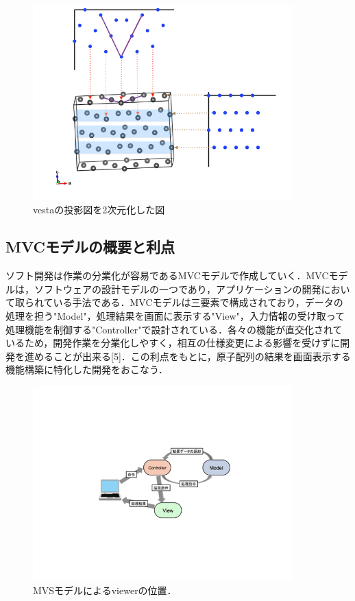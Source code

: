 \begin{figure}[htbp]\begin{center}
\includegraphics[width=10cm,bb= 0 0 737 553]{../figs/./boundary_narita.007.jpeg}
\caption{vestaの投影図を2次元化した図}
\label{default}\end{center}\end{figure}
\subsection{MVCモデルの概要と利点}
ソフト開発は作業の分業化が容易であるMVCモデルで作成していく．MVCモデルは，ソフトウェアの設計モデルの一つであり，アプリケーションの開発において取られている手法である．MVCモデルは三要素で構成されており，データの処理を担う"Model"，処理結果を画面に表示する"View"，入力情報の受け取って処理機能を制御する"Controller"で設計されている．各々の機能が直交化されているため，開発作業を分業化しやすく，相互の仕様変更による影響を受けずに開発を進めることが出来る[5]．この利点をもとに，原子配列の結果を画面表示する機能構築に特化した開発をおこなう．

\begin{figure}[htbp]\begin{center}
\includegraphics[width=10cm,bb= 0 0 737 553]{../figs/./boundary_narita.005.jpeg}
\caption{MVSモデルによるviewerの位置．}
\label{default}\end{center}\end{figure}
